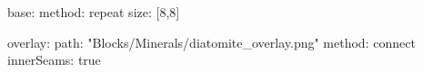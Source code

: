 base:
  method: repeat
  size: [8,8]

overlay:
  path: "Blocks/Minerals/diatomite_overlay.png"
  method: connect
  innerSeams: true